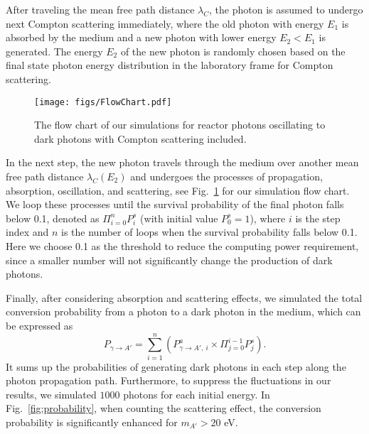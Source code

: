 \documentclass[prd,showpacs,preprintnumbers,amsmath,amssymb,twocolumn,superscriptaddress,notitlepage]{revtex4-2}
\begin{document}
After traveling the mean free path distance $\lambda_C$, the photon is assumed to undergo next Compton scattering immediately, where the old photon with energy $E_1$ is absorbed by the medium and a new photon with lower energy $E_2 < E_1$ is generated. The energy $E_2$ of the new photon is randomly chosen based on the final state photon energy distribution in the laboratory frame for Compton scattering.




\begin{figure}[htbp]
\begin{centering} 
\texttt{[image: figs/FlowChart.pdf]} 
\caption{The flow chart of our simulations for 
reactor photons oscillating to dark photons 
with Compton scattering included.
}
\label{fig: Flow Chart}
\end{centering}
\end{figure}








In the next step, the new photon travels through the medium over another mean free path distance $\lambda_C(E_2)$ and undergoes the processes of propagation, absorption, oscillation, and scattering, see Fig.~\ref{fig: Flow Chart} 
for our simulation flow chart.
% 
We loop these processes until the survival probability of the final photon falls below 0.1, denoted as $\Pi_{i=0}^n P^s_i$ (with initial value $P^s_0 = 1$), 
where $i$ is the step index 
and $n$ is the number of loops when the survival probability falls below 0.1.  
Here we choose 0.1 as the threshold to reduce the computing power requirement, 
since a smaller number will not significantly change the production of dark photons.


Finally, after considering absorption and scattering effects, we simulated the total conversion probability from a photon to a dark photon in the medium, which can be expressed as
\begin{equation}
P_{\gamma \to A'} = \sum_{i=1}^n \left(P^a_{\gamma \to A',\ i} \times \Pi_{j=0}^{i-1} P^s_j \right).
\label{eq: prob single photon}
\end{equation}
It sums up the probabilities of generating dark photons in each step along the photon propagation path.
Furthermore, to suppress the fluctuations in our results,
we simulated $1000$ photons for each initial energy. In Fig.~\ref{fig:probability}, when counting the scattering effect, the conversion probability is significantly enhanced for $m_{A'} > 20$ eV. 
\\
\end{document}
